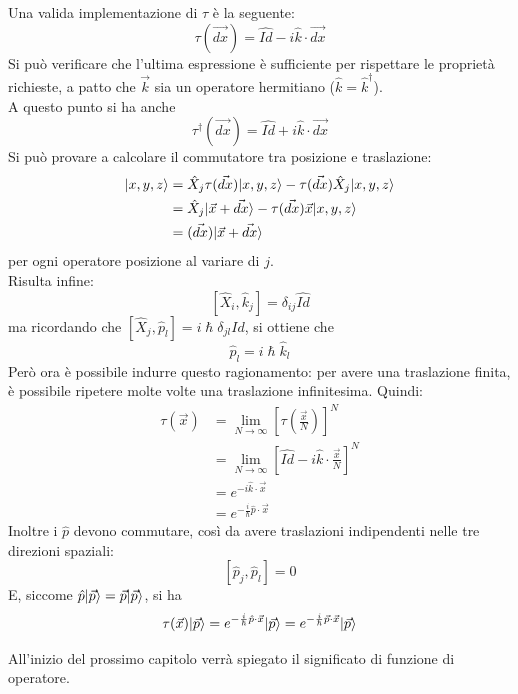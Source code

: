 Una valida implementazione di $\tau$ è la seguente:
\[
    \tau (\vec {dx}) = \hat{Id} - i \hat k \cdot \vec{dx}
\]
Si può verificare che l'ultima espressione è sufficiente per rispettare le proprietà richieste, a patto che $\vec{k}$ sia un operatore hermitiano ($\hat{k} = \hat{k} ^ \dag$). \\
A questo punto si ha anche
\[
    \tau^\dag (\vec{dx}) = \hat{Id} + i \hat k \cdot \vec{dx}
\]
Si può provare a calcolare il commutatore tra posizione e traslazione:
\begin{align*}
    [\hat{X}_j, \tau(\vec{dx})] \vpos &= \hat{X}_j \tau(\vec{dx}) \vpos - \tau(\vec{dx}) \hat{X}_j \vpos \\
    &= \hat{X}_j |\vec x + \vec{dx}\ket - \tau(\vec{dx}) \vec x \vpos \\
    &= (\vec{dx}) |\vec x + \vec{dx}\ket
\end{align*}
per ogni operatore posizione al variare di $j$. \\
Risulta infine:
\[
    [\hat{X}_i, \hat{k}_j] = \delta_{ij} \hat{Id}
\]
ma ricordando che $[\hat{X}_j, \hat{p}_l] = i \hslash \delta_{jl} \hat{Id}$, si ottiene che
\[
    \hat{p}_l = i\hslash \hat{k}_l
\]
Però ora è possibile indurre questo ragionamento: per avere una traslazione finita, è possibile ripetere molte volte una traslazione infinitesima. Quindi:
\begin{align*}
    \tau(\vec{x}) &= \lim_{N \to \infty} \left[ \tau\left(\frac{\vec{x}}{N}\right) \right]^N \\
    &= \lim_{N \to \infty} \left[ \hat{Id} - i \hat{k} \cdot \frac{\vec{x}}{N} \right]^N \\
    &= e^{-i \hat{k} \cdot \vec{x}} \\
    &= e^{-\frac{i}{\hslash} \hat{p} \cdot \vec{x}}
\end{align*}
Inoltre i $\hat p$ devono commutare, così da avere traslazioni indipendenti nelle tre direzioni spaziali:
\[
    [\hat{p}_j, \hat{p}_l] = 0
\]
E, siccome $\hat p |\vec p\rangle = \vec p |\vec p\rangle$, si ha
\[
    \tau(\vec x)|\vec p\rangle = e^{-\frac{i}{\hslash} \hat p \cdot \vec x} |\vec p\rangle = e^{-\frac{i}{\hslash} \vec p \cdot \vec x} |\vec p\rangle
\]

All'inizio del prossimo capitolo verrà spiegato il significato di funzione di operatore.

